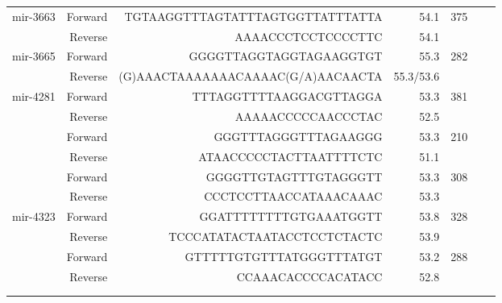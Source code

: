 \begin{table}
{\begin{tabular}{lrrrlll}
mir-3663	&	Forward	&	TGTAAGGTTTAGTATTTAGTGGTTATTTATTA	&	54.1	&	375\\
{}	&	Reverse	&	AAAACCCTCCTCCCCTTC	&	54.1	&	{}\\
mir-3665	&	Forward	&	GGGGTTAGGTAGGTAGAAGGTGT	&	55.3	&	282\\
{}	&	Reverse	&	(G)AAACTAAAAAAACAAAAC(G/A)AACAACTA	&	55.3/53.6	&	{}\\
mir-4281	&	Forward	&	TTTAGGTTTTAAGGACGTTAGGA	&	53.3	&	381\\
{}	&	Reverse	&	AAAAACCCCCAACCCTAC	&	52.5	&	{}\\
{}	&	Forward	&	GGGTTTAGGGTTTAGAAGGG	&	53.3	&	210\\
{}	&	Reverse	&	ATAACCCCCTACTTAATTTTCTC	&	51.1	&	{}\\
{}	&	Forward	&	GGGGTTGTAGTTTGTAGGGTT	&	53.3	&	308\\
{}	&	Reverse	&	CCCTCCTTAACCATAAACAAAC	&	53.3	&	{}\\
mir-4323	&	Forward	&	GGATTTTTTTTGTGAAATGGTT	&	53.8	&	328\\
{}	&	Reverse	&	TCCCATATACTAATACCTCCTCTACTC	&	53.9	&	{}\\
{}	&	Forward	&	GTTTTTGTGTTTATGGGTTTATGT	&	53.2	&	288\\
{}	&	Reverse	&	CCAAACACCCCACATACC	&	52.8	&	{}\\

& & & & & &
\\
\hline & & & & & & \\
\end{tabular}
}
\label{tableSM:GEOdatasets}
\end{table}

